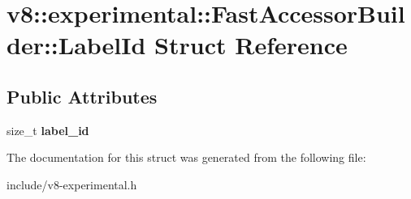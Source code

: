 \hypertarget{structv8_1_1experimental_1_1_fast_accessor_builder_1_1_label_id}{}\section{v8\+:\+:experimental\+:\+:Fast\+Accessor\+Builder\+:\+:Label\+Id Struct Reference}
\label{structv8_1_1experimental_1_1_fast_accessor_builder_1_1_label_id}
\subsection*{Public Attributes}
\begin{DoxyCompactItemize}
\item 
size\+\_\+t {\bfseries label\+\_\+id}\hypertarget{structv8_1_1experimental_1_1_fast_accessor_builder_1_1_label_id_abdf1bdba753c7de77ad908dc75c8c58b}{}\label{structv8_1_1experimental_1_1_fast_accessor_builder_1_1_label_id_abdf1bdba753c7de77ad908dc75c8c58b}

\end{DoxyCompactItemize}


The documentation for this struct was generated from the following file\+:\begin{DoxyCompactItemize}
\item 
include/v8-\/experimental.\+h\end{DoxyCompactItemize}
